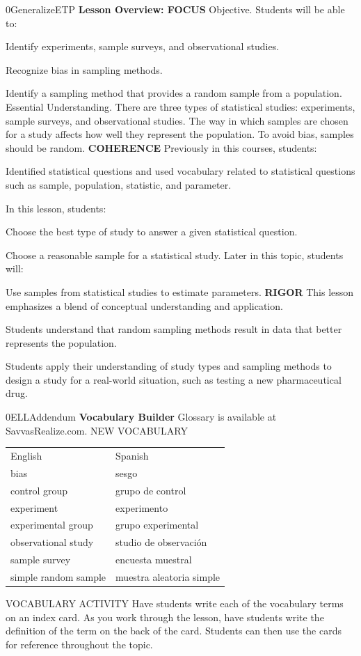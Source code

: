 \documentclass{article}
\newenvironment{te-addendum}[2]{}{}     %
\newcommand{\te}[1]{}                   %
\begin{document}
\begin{te-addendum}{0}{GeneralizeETP}
\textbf{Lesson Overview: FOCUS}
Objective. Students will be able to:
\item Identify experiments, sample surveys, and observational studies.
\item Recognize bias in sampling methods.
\item Identify a sampling method that provides a random sample from a population.
Essential Understanding. There are three types of statistical studies: experiments, sample surveys, and observational studies. The way in which samples are chosen for a study affects how well they represent the population. To avoid bias, samples should be random.
\textbf{COHERENCE}
Previously in this courses, students:
\item Identified statistical questions and used vocabulary related to statistical questions such as sample, population, statistic, and parameter.
\te{Printed this courses; likely this course.}
In this lesson, students:
\item Choose the best type of study to answer a given statistical question.
\item Choose a reasonable sample for a statistical study.
Later in this topic, students will:
\item Use samples from statistical studies to estimate parameters.
\textbf{RIGOR}
This lesson emphasizes a blend of conceptual understanding and application.
\item Students understand that random sampling methods result in data that better represents the population.
\item Students apply their understanding of study types and sampling methods to design a study for a real-world situation, such as testing a new pharmaceutical drug.
\end{te-addendum}
\begin{te-addendum}{0}{ELLAddendum}
\textbf{Vocabulary Builder}
Glossary is available at SavvasRealize.com.
NEW VOCABULARY
\begin{tabular}{ll}
English & Spanish \\
bias & sesgo \\
control group & grupo de control \\
experiment & experimento \\
experimental group & grupo experimental \\
observational study & studio de observación \\
sample survey & encuesta muestral \\
simple random sample & muestra aleatoria simple \\
\end{tabular}
\te{Printed studio de observación; likely estudio de observación.}
VOCABULARY ACTIVITY
Have students write each of the vocabulary terms on an index card. As you work through the lesson, have students write the definition of the term on the back of the card. Students can then use the cards for reference throughout the topic.
\end{te-addendum}
\end{document}
